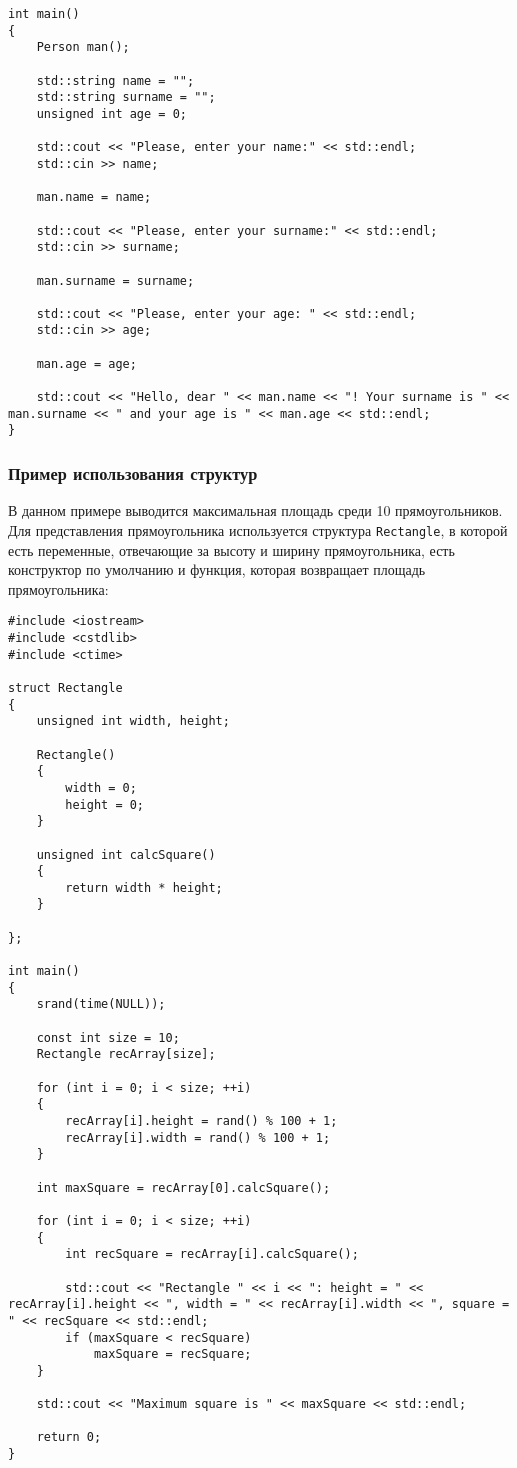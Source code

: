 \begin{lstlisting}
int main()
{
    Person man();

    std::string name = "";
    std::string surname = "";
    unsigned int age = 0;

    std::cout << "Please, enter your name:" << std::endl;
    std::cin >> name;

    man.name = name;

    std::cout << "Please, enter your surname:" << std::endl;
    std::cin >> surname;

    man.surname = surname;

    std::cout << "Please, enter your age: " << std::endl;
    std::cin >> age;

    man.age = age;

    std::cout << "Hello, dear " << man.name << "! Your surname is " << man.surname << " and your age is " << man.age << std::endl;
}
\end{lstlisting} 

\subsubsection{Пример использования структур}
В данном примере выводится максимальная площадь среди 10 прямоугольников. Для представления прямоугольника используется структура \lstinline|Rectangle|, в которой есть переменные, отвечающие за высоту и ширину прямоугольника, есть конструктор по умолчанию и функция, которая возвращает площадь прямоугольника:

\begin{lstlisting}
#include <iostream>
#include <cstdlib>
#include <ctime>

struct Rectangle
{
    unsigned int width, height;

    Rectangle()
    {
    	width = 0;
    	height = 0;
    }

    unsigned int calcSquare()
    {
    	return width * height;
    }

};

int main()
{
    srand(time(NULL));

    const int size = 10;
    Rectangle recArray[size];

    for (int i = 0; i < size; ++i)
    {
    	recArray[i].height = rand() % 100 + 1;
    	recArray[i].width = rand() % 100 + 1;
    }

    int maxSquare = recArray[0].calcSquare();

    for (int i = 0; i < size; ++i)
    {
    	int recSquare = recArray[i].calcSquare();

    	std::cout << "Rectangle " << i << ": height = " << recArray[i].height << ", width = " << recArray[i].width << ", square = " << recSquare << std::endl;
    	if (maxSquare < recSquare)
    		maxSquare = recSquare;
    }

    std::cout << "Maximum square is " << maxSquare << std::endl;

    return 0;
}
\end{lstlisting}

